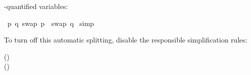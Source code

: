 \begin{isabellebody}
\begin{isamarkuptext}
\isa{{\isasymexists}}-quantified variables:%
\end{isamarkuptext}%
\isamarkuptrue%
\isamarkupfalse%
\ {\isachardoublequoteopen}{\isasymforall}p{\isachardot}\ {\isasymexists}q{\isachardot}\ swap\ p\ {\isacharequal}\ swap\ q{\isachardoublequoteclose}\isanewline
%
\isadelimproof
%
\endisadelimproof
%
\isatagproof
{}\isamarkupfalse%
\ simp%
\endisatagproof
{\isafoldproof}%
%
\isadelimproof
%
\endisadelimproof
%
\begin{isamarkuptext}%
\noindent
To turn off this automatic splitting, disable the
responsible simplification rules:
\begin{center}
\hfill
()\\
\hfill
()
\end{center}%
\end{isamarkuptext}%
\isamarkuptrue%
%
\isadelimtheory
%
\endisadelimtheory
%
\isatagtheory
%
\endisatagtheory
{\isafoldtheory}%
%
\isadelimtheory
%
\endisadelimtheory
\end{isabellebody}%
